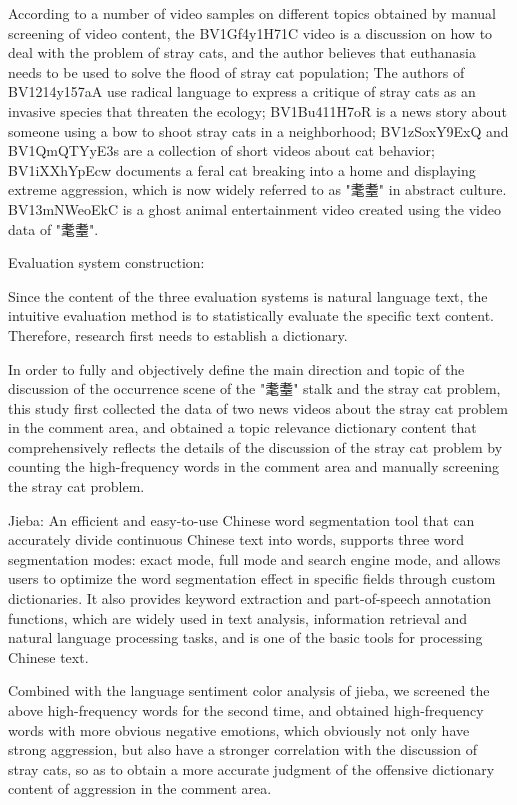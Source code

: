 \documentclass[12pt,a4paper]{ctexart}
\theoremstyle{MyLineTheoremStyle}
\theoremstyle{MyBlockTheoremStyle}
\theoremstyle{MySubsubsectionStyle}
\begin{document}
According to a number of video samples on different topics obtained by manual screening of video content, the BV1Gf4y1H71C video is a discussion on how to deal with the problem of stray cats, and the author believes that euthanasia needs to be used to solve the flood of stray cat population; The authors of BV1214y157aA use radical language to express a critique of stray cats as an invasive species that threaten the ecology; BV1Bu411H7oR is a news story about someone using a bow to shoot stray cats in a neighborhood; BV1zSoxY9ExQ and BV1QmQTYyE3s are a collection of short videos about cat behavior; BV1iXXhYpEcw documents a feral cat breaking into a home and displaying extreme aggression, which is now widely referred to as "耄耋" in abstract culture. BV13mNWeoEkC is a ghost animal entertainment video created using the video data of "耄耋".

Evaluation system construction:

Since the content of the three evaluation systems is natural language text, the intuitive evaluation method is to statistically evaluate the specific text content. Therefore, research first needs to establish a dictionary.

In order to fully and objectively define the main direction and topic of the discussion of the occurrence scene of the "耄耋" stalk and the stray cat problem, this study first collected the data of two news videos about the stray cat problem in the comment area, and obtained a topic relevance dictionary content that comprehensively reflects the details of the discussion of the stray cat problem by counting the high-frequency words in the comment area and manually screening the stray cat problem.

Jieba: An efficient and easy-to-use Chinese word segmentation tool that can accurately divide continuous Chinese text into words, supports three word segmentation modes: exact mode, full mode and search engine mode, and allows users to optimize the word segmentation effect in specific fields through custom dictionaries. It also provides keyword extraction and part-of-speech annotation functions, which are widely used in text analysis, information retrieval and natural language processing tasks, and is one of the basic tools for processing Chinese text.

Combined with the language sentiment color analysis of jieba, we screened the above high-frequency words for the second time, and obtained high-frequency words with more obvious negative emotions, which obviously not only have strong aggression, but also have a stronger correlation with the discussion of stray cats, so as to obtain a more accurate judgment of the offensive dictionary content of aggression in the comment area.
\end{document}
